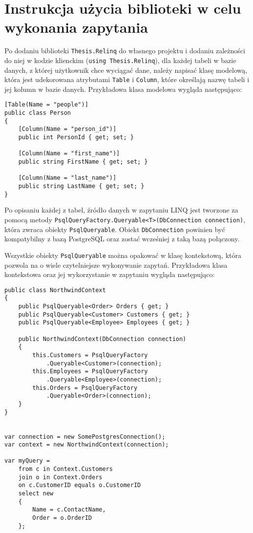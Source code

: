\chapter{Instrukcja użycia biblioteki w celu wykonania zapytania}
Po dodaniu biblioteki \texttt{Thesis.Relinq} do własnego projektu i dodaniu zależności do niej w kodzie klienckim (\texttt{using Thesis.Relinq}), dla każdej tabeli w bazie danych, z której użytkownik chce wyciągać dane, należy napisać klasę modelową, która jest udekorowana atrybutami \texttt{Table} i \texttt{Column}, które określają nazwę tabeli i jej kolumn w bazie danych. Przykładowa klasa modelowa wygląda następująco:

\begin{lstlisting}
[Table(Name = "people")]
public class Person
{
    [Column(Name = "person_id")]
    public int PersonId { get; set; }

    [Column(Name = "first_name")]
    public string FirstName { get; set; }

    [Column(Name = "last_name")]
    public string LastName { get; set; }
}
\end{lstlisting}

Po opisaniu każdej z tabel, źródło danych w zapytaniu LINQ jest tworzone za pomocą metody \texttt{PsqlQueryFactory.Queryable<T>(DbConnection connection)}, która zwraca obiekty \texttt{PsqlQueryable}. Obiekt \texttt{DbConnection} powinien być kompatybilny z bazą PostgreSQL oraz zostać wcześniej z taką bazą połączony.

Wszystkie obiekty \texttt{PsqlQueryable} można opakować w klasę kontekstową, która pozwola na o wiele czytelniejsze wykonywanie zapytań. Przykładowa klasa kontekstowa oraz jej wykorzystanie w zapytaniu wygląda następująco:

\pagebreak

\begin{lstlisting}
public class NorthwindContext
{
    public PsqlQueryable<Order> Orders { get; }
    public PsqlQueryable<Customer> Customers { get; }
    public PsqlQueryable<Employee> Employees { get; }

    public NorthwindContext(DbConnection connection)
    {
        this.Customers = PsqlQueryFactory
            .Queryable<Customer>(connection);
        this.Employees = PsqlQueryFactory
            .Queryable<Employee>(connection);
        this.Orders = PsqlQueryFactory
            .Queryable<Order>(connection);
    }
}


var connection = new SomePostgresConnection();
var context = new NorthwindContext(connection);

var myQuery =
    from c in Context.Customers
    join o in Context.Orders
    on c.CustomerID equals o.CustomerID
    select new
    {
        Name = c.ContactName,
        Order = o.OrderID
    };
\end{lstlisting}